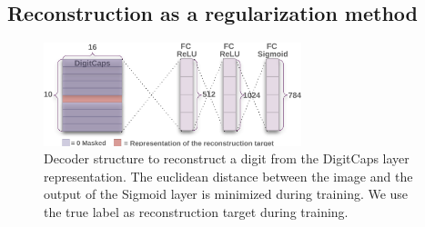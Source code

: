 \documentclass{article}
\begin{document}
\subsection{Reconstruction as a regularization method}
\begin{figure}[t]
  \caption{Decoder structure to reconstruct a digit from the DigitCaps layer representation. The euclidean distance between the image and the output of the Sigmoid layer is minimized during training. We use the true label as reconstruction target during training.}
  \label{reconsArch}
  \centering
    \includegraphics[height=3cm]{reconsArch}
\end{figure}
\end{document}
